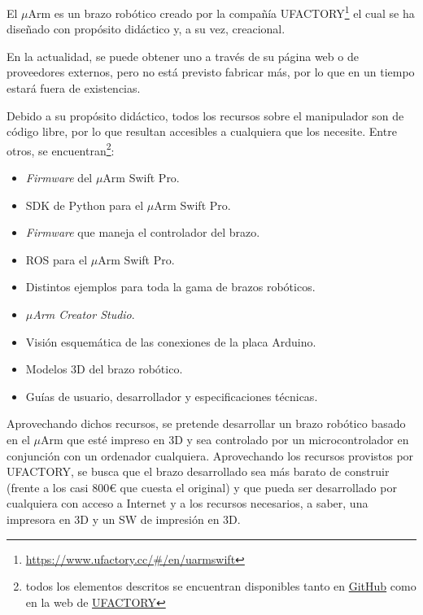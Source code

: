 El $\mu$Arm es un brazo robótico creado por la compañía UFACTORY\footnote{\url{https://www.ufactory.cc/\#/en/uarmswift}} el cual se ha diseñado con propósito didáctico y, a su vez, creacional.

En la actualidad, se puede obtener uno a través de su página web o de proveedores externos, pero no está previsto fabricar más, por lo que en un tiempo estará fuera de existencias.

Debido a su propósito didáctico, todos los recursos sobre el manipulador son de código libre, por lo que resultan accesibles a cualquiera que los necesite. Entre otros, se encuentran\footnote{todos los elementos descritos se encuentran disponibles tanto en \href{https://github.com/uArm-Developer}{GitHub} como en la web de \href{https://www.ufactory.cc/\#/en/support/download/pro}{UFACTORY}}:

\begin{itemize}
    \item \textit{Firmware} del $\mu$Arm Swift Pro.
    \item \ac{SDK} de Python para el $\mu$Arm Swift Pro.
    \item \textit{Firmware} que maneja el controlador del brazo.
    \item \ac{ROS} para el $\mu$Arm Swift Pro.
    \item Distintos ejemplos para toda la gama de brazos robóticos.
    \item \textit{$\mu$Arm Creator Studio}.
    \item Visión esquemática de las conexiones de la placa Arduino.
    \item Modelos 3D del brazo robótico.
    \item Guías de usuario, desarrollador y especificaciones técnicas.
\end{itemize}

Aprovechando dichos recursos, se pretende desarrollar un brazo robótico basado en el $\mu$Arm que esté impreso en 3D y sea controlado por un microcontrolador en conjunción con un ordenador cualquiera. Aprovechando los recursos provistos por UFACTORY, se busca que el brazo desarrollado sea más barato de construir (frente a los casi 800\euro{} que cuesta el original) y que pueda ser desarrollado por cualquiera con acceso a Internet y a los recursos necesarios, a saber, una impresora en 3D y un \ac{SW} de impresión en 3D.